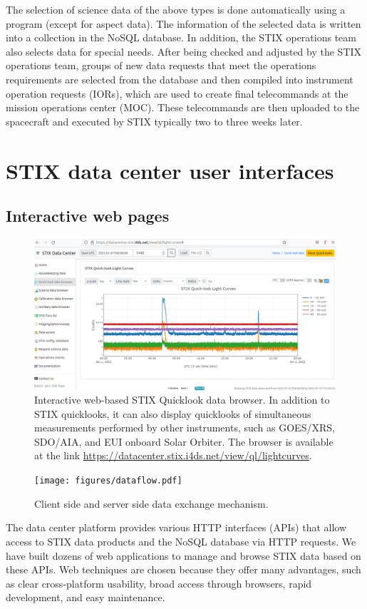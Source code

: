 \documentclass[referee]{preaa} %
\begin{document}
The selection of science data of the above types is done automatically using a program (except for aspect data). The information of the selected data is written into a collection in the NoSQL database.  In addition, the STIX operations team also selects data for special 
needs.  After being checked and adjusted by the STIX operations team, groups of new data requests that meet the operations requirements are selected from the database and then compiled into instrument operation requests (IORs), which are used to create final telecommands at the mission operations center (MOC). 
These telecommands are then uploaded to the spacecraft and executed by STIX typically two to three weeks later. 

\section{STIX data center user interfaces}
\subsection{Interactive web pages}


\begin{figure}[ht]
  \centering
  \includegraphics[width=0.95\linewidth]{figures/data-browser.pdf}
  \caption{ 
    Interactive web-based STIX Quicklook data browser. 
    In addition to STIX quicklooks, it can also display quicklooks of simultaneous measurements  performed by other instruments, such as GOES/XRS, SDO/AIA, and EUI onboard Solar Orbiter.     The browser is available at the link \url{https://datacenter.stix.i4ds.net/view/ql/lightcurves}.}
  \label{fig:qlbrowser}
\end{figure}
\begin{figure}[ht]
  \centering
  \texttt{[image: figures/dataflow.pdf]}
  \caption{ 
   Client side and server side data exchange mechanism. 
  }
  \label{fig:interfaces}
\end{figure}
The data center platform provides various HTTP interfaces (APIs) that allow access to STIX data products
and the NoSQL database via HTTP requests. 
We have built dozens of web applications to manage and browse STIX data based on these APIs. 
Web techniques are chosen because they offer many advantages, such as clear cross-platform 
usability, broad access through browsers, rapid development, and easy maintenance.
\end{document}
